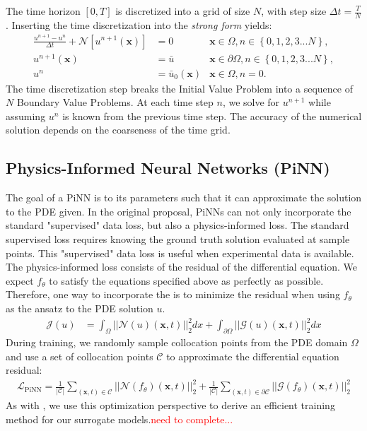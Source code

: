The time horizon $[0, T]$ is discretized into a grid of size $N$, with step size $\Delta t = \frac{T}{N}$. Inserting the time discretization into the \emph{strong form} yields:
\begin{align}
    \frac{u^{n+1} - u^{n}}{\Delta t} + \mathcal{N}\left[ u ^{n+1}(\bm{x})\right] &= 0 &\bm{x} \in \Omega, n \in \left \lbrace 0,1,2,3...N\right\rbrace ,  \\
    u^{n+1}(\bm{x}) &= \bar{u} & \bm{x} \in \partial\Omega, n \in \left \lbrace 0,1,2,3...N\right\rbrace , \\
    u^n &= \bar{u}_0(\bm{x}) &\bm{x} \in \Omega, n = 0.
\end{align}
The time discretization step breaks the Initial Value Problem into a sequence of $N$ Boundary Value Problems. At each time step $n$, we solve for $u^{n+1}$ while assuming $u^{n}$ is known from the previous time step. The accuracy of the numerical solution depends on the coarseness of the time grid. 

\subsection{Physics-Informed Neural Networks (PiNN)}
The goal of a PiNN is to its parameters such that it can approximate the solution to the PDE given. In the original proposal, PiNNs can not only incorporate the standard "supervised" data loss, but also a physics-informed loss. The standard supervised loss requires knowing the ground truth solution evaluated at sample points. This "supervised" data loss is useful when experimental data is available. The physics-informed loss consists of the residual of the differential equation. We expect $f_{\theta}$ to satisfy the equations specified above as perfectly as possible. Therefore, one way to incorporate the is to minimize the residual when using $f_\theta$ as the ansatz to the PDE solution $u$. 
\begin{align*}
  \mathcal{J}(u) &= \int_{\Omega} ||\mathcal{N}(u)(\bm{x}, t)||^2_2 dx + \int_{\partial\Omega} ||\mathcal{G}(u)(\bm{x}, t)||_2^2 dx
\end{align*}
During training, we randomly sample collocation points from the PDE domain $\Omega$ and use a set of collocation points $\mathcal{C}$ to approximate the differential equation residual:
\begin{align}
    \mathcal{L}_{\text{PiNN}} = \frac{1}{|\mathcal{C}|} \sum_{(\bm{x}, t) \in \mathcal{C}} || \mathcal{N} (f_{\theta})(\bm{x}, t) ||_2^2  + \frac{1}{|\mathcal{C}|}  \sum_{{(\bm{x}, t) \in \mathcal{\partial \mathcal{C}}} } ||\mathcal{G}(f_{\theta})(\bm{x}, t)||_2^2 
\end{align}
As with \citet{xue2020amortized}, we use this optimization perspective
to derive an efficient training method for our surrogate models.\textcolor{red}{need to complete...}